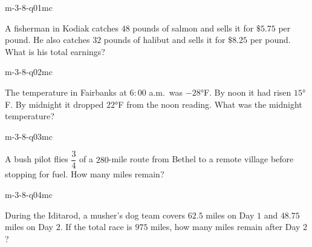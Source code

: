 

\begin{practiceQuestion}{m-3-8-q01}{mc}
\begin{questionText}
A fisherman in Kodiak catches $48$ pounds of salmon and sells it for $\$5.75$ per pound. He also catches $32$ pounds of halibut and sells it for $\$8.25$ per pound. What is his total earnings?
\end{questionText}
\end{practiceQuestion}

\begin{practiceQuestion}{m-3-8-q02}{mc}
\begin{questionText}
The temperature in Fairbanks at $6{:}00$ a.m.\ was $-28°$F. By noon it had risen $15°$F. By midnight it dropped $22°$F from the noon reading. What was the midnight temperature?
\end{questionText}
\end{practiceQuestion}

\begin{practiceQuestion}{m-3-8-q03}{mc}
\begin{questionText}
A bush pilot flies $\dfrac{3}{4}$ of a $280$-mile route from Bethel to a remote village before stopping for fuel. How many miles remain?
\end{questionText}
\end{practiceQuestion}

\begin{practiceQuestion}{m-3-8-q04}{mc}
\begin{questionText}
During the Iditarod, a musher's dog team covers $62.5$ miles on Day $1$ and $48.75$ miles on Day $2$. If the total race is $975$ miles, how many miles remain after Day $2$?
\end{questionText}
\end{practiceQuestion}

